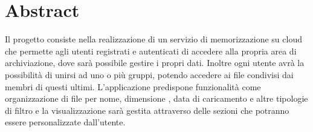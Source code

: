 \chapter*{Abstract}

Il progetto consiste nella realizzazione di un servizio di 
memorizzazione su cloud che permette agli utenti registrati e 
autenticati di accedere alla propria area di archiviazione, dove sarà 
possibile gestire i propri dati. Inoltre ogni utente avrà la 
possibilità di unirsi ad uno o più gruppi, potendo accedere ai file 
condivisi dai membri di questi ultimi.
L’applicazione predispone funzionalità come organizzazione di file per 
nome, dimensione , data di caricamento e altre tipologie di filtro e 
la visualizzazione sarà gestita attraverso delle sezioni che potranno 
essere personalizzate dall’utente.